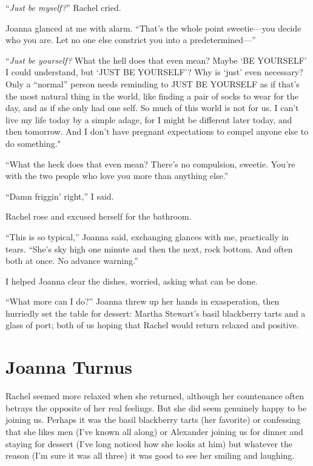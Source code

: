 ``\emph{Just be myself?}'' Rachel cried.

Joanna glanced at me with alarm. ``That's the whole point sweetie---you
decide who you are. Let no one else constrict you into a
pre\-de\-ter\-mined---''

``\emph{Just be yourself?} What the hell does that even mean? Maybe `BE
YOURSELF' I could understand, but `JUST BE YOURSELF'? Why is `just' even
necessary? Only a ``normal'' person needs reminding to JUST BE YOURSELF
as if that's the most natural thing in the world, like finding a pair of
socks to wear for the day, and as if she only had one self. So much of
this world is not for us. I can't live my life today by a simple adage,
for I might be different later today, and then tomorrow. And I don't
have pregnant expectations to compel anyone else to do something."

``What the heck does that even mean? There's no compulsion, sweetie.
You're with the two people who love you more than anything else.''

``Damn friggin' right,'' I said.

Rachel rose and excused herself for the bathroom.

``This is so typical,'' Joanna said, exchanging glances with me,
practically in tears. ``She's sky high one minute and then the next,
rock bottom. And often both at once. No advance warning.''

I helped Joanna clear the dishes, worried, asking what can be done.

``What more can I do?'' Joanna threw up her hands in exasperation, then
hurriedly set the table for dessert: Martha Stewart's basil blackberry
tarts and a glass of port; both of us hoping that Rachel would return
relaxed and positive.

\chapter{Joanna Turnus}

\titlemark

Rachel seemed more relaxed when she returned, although her countenance
often betrays the opposite of her real feelings. But she did seem
genuinely happy to be joining us. Perhaps it was the basil blackberry
tarts (her favorite) or confessing that she likes men (I've known all
along) or Alexander joining us for dinner and staying for dessert (I've
long noticed how she looks at him) but whatever the reason (I'm sure it
was all three) it was good to see her smiling and laughing.

